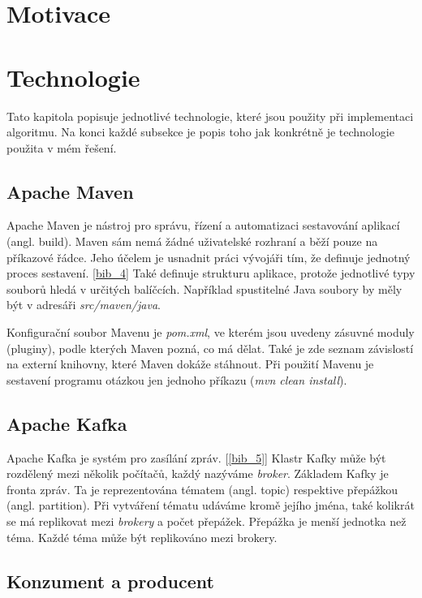 \documentclass[
  digital, %
  table,   %
  nolof,     %
  nolot,     %
  twoside,
  nocover,
  monochrome,
  12pt
]{fithesis3}
\begin{document}
\section{Motivace}
\section{Technologie}
Tato kapitola popisuje jednotlivé technologie, které jsou použity při implementaci algoritmu. Na konci každé subsekce je popis toho jak konkrétně je technologie použita v mém řešení.

\subsection{Apache Maven}
Apache Maven je nástroj pro správu, řízení a automatizaci sestavování aplikací (angl. build). Maven sám nemá žádné uživatelské rozhraní a běží pouze na příkazové řádce. Jeho účelem je usnadnit práci vývojáři tím, že definuje jednotný proces sestavení. \ref{bib_4} Také definuje strukturu aplikace, protože jednotlivé typy souborů hledá v určitých balíčcích. Například spustitelné Java soubory by měly být v adresáři \textit{src/maven/java}.

Konfigurační soubor Mavenu je \textit{pom.xml}, ve kterém jsou uvedeny zásuvné moduly (pluginy), podle kterých Maven pozná, co má dělat. Také je zde seznam závislostí na externí knihovny, které Maven dokáže stáhnout. Při použití Mavenu je sestavení programu otázkou jen jednoho příkazu (\textit{mvn clean install}).

\subsection{Apache Kafka}
Apache Kafka je systém pro zasílání zpráv. [\ref{bib_5}] Klastr Kafky může být rozdělený mezi několik počítačů, každý nazýváme \textit{broker}. Základem Kafky je fronta zpráv. Ta je reprezentována tématem (angl. topic) respektive přepážkou (angl. partition). Při vytváření tématu udáváme kromě jejího jména, také kolikrát se má replikovat mezi \textit{brokery} a počet přepážek. Přepážka je menší jednotka než téma. Každé téma může být replikováno mezi brokery.

\subsection*{Konzument a producent}
\end{document}
